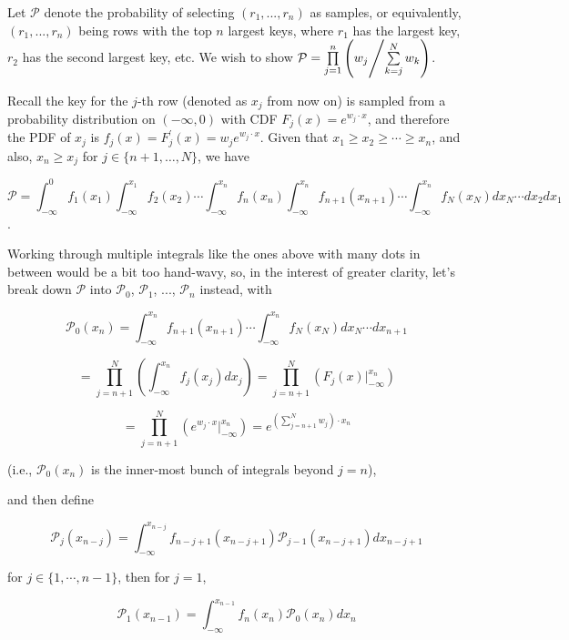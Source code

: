 \documentclass[fleqn]{article}
\begin{document}
Let $\mathcal{P}$ denote the probability of selecting $(r_1, ..., r_n)$ as samples, or equivalently, $(r_1, ..., r_n)$ being rows with the top $n$ largest keys, where $r_1$ has the largest key, $r_2$ has the second largest key, etc. We wish to show $\mathcal{P} = \prod\limits_{j = 1}^{n} \left( {w_j} \middle/ {\sum\limits_{k = j}^{N}{w_k}} \right)$.

\bigskip

Recall the key for the $j$-th row (denoted as $x_j$ from now on) is sampled from a probability distribution on $(-\infty, 0)$ with CDF $F_j(x) = e^{w_j \cdot x}$, and therefore the PDF of $x_j$ is $f_j(x) = F_j^\prime(x) = w_j e^{w_j \cdot x}$. Given that $x_1 \ge x_2 \ge \cdots \ge x_n$, and also, $x_n \ge x_j$ for $j \in \{ n + 1, \dots, N \}$, we have

$$
\mathcal{P} = \int_{-\infty}^{0}f_1(x_1)\int_{-\infty}^{x_1}f_2(x_2) \cdots \int_{-\infty}^{x_n}f_n(x_n) \int_{-\infty}^{x_n} f_{n + 1}(x_{n + 1}) \cdots \int_{-\infty}^{x_n} f_{N}(x_{N}) d x_N \cdots d x_2 d x_1
$$.

Working through multiple integrals like the ones above with many dots in between would be a bit too hand-wavy, so, in the interest of greater clarity, let's break down $\mathcal{P}$ into $\mathcal{P}_0$, $\mathcal{P}_1$, ..., $\mathcal{P}_n$ instead, with

\bigskip

$$
\mathcal{P}_0(x_n) = \int_{-\infty}^{x_n} f_{n + 1}(x_{n + 1}) \cdots \int_{-\infty}^{x_n} f_N(x_N) d x_N \cdots d x_{n + 1}
$$

$$
 = \prod\limits_{j = n + 1}^N\left(\int_{-\infty}^{x_n} f_j(x_j) d x_j\right)
 = \prod\limits_{j = n + 1}^N\left(F_j(x)\bigg\rvert_{-\infty}^{x_n}\right)
$$

$$
 = \prod\limits_{j = n + 1}^N\left(e^{w_j \cdot x} \bigg\rvert_{-\infty}^{x_n}\right)
 = e^{\left(\sum\limits_{j = n + 1}^N w_j\right) \cdot x_n}
$$

\bigskip

(i.e., $\mathcal{P}_0(x_n)$ is the inner-most bunch of integrals beyond $j = n$),

\bigskip

and then define

$$
\mathcal{P}_j(x_{n - j}) = \int_{-\infty}^{x_{n-j}}f_{n - j + 1}(x_{n - j + 1}) \mathcal{P}_{j - 1}(x_{n - j + 1}) d x_{n - j + 1}
$$

for $j \in \{1, \cdots, n - 1\}$, then for $j = 1$,

$$
\mathcal{P}_1(x_{n - 1}) = \int_{-\infty}^{x_{n - 1}}f_n(x_n) \mathcal{P}_0(x_n) d x_n
$$
\end{document}
